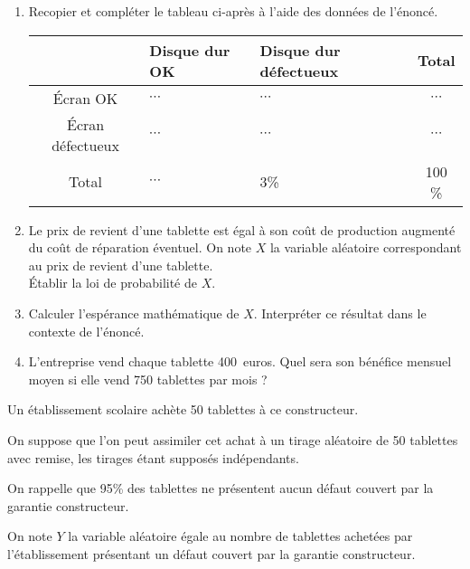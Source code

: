 \begin{enumerate}
     \par
     \item %
     Recopier et compléter le tableau ci-après à l'aide des données de l'énoncé.
     \begin{center}
          \begin{tabular}{|c|p{2cm}|p{2cm}|c|}%
               \hline
               $\ $ & Disque dur OK & Disque dur défectueux & Total \\
               \hline
               \'Ecran OK &  $\cdots$ & $\cdots$ & $\cdots$ \\
               \hline
               \'Ecran défectueux &  $\cdots$ & $\cdots$ & $\cdots$ \\
               \hline
               Total & $\cdots$ & 3\% & 100 \% \\
               \hline
          \end{tabular}
     \end{center}
     \item %
     Le prix de revient d'une tablette est égal à son coût de production augmenté du coût de réparation éventuel.
     On note $X$ la variable aléatoire correspondant au prix de revient d'une tablette.\\
     \'Etablir la loi de probabilité de $X$.
     \par
     \item %
     Calculer l'espérance mathématique de $X$. Interpréter ce résultat dans le contexte de l'énoncé.
     \par
     \item %
     L'entreprise vend chaque tablette 400~euros. Quel sera son bénéfice mensuel moyen si elle vend 750 tablettes par mois ?
     \par
\end{enumerate}
\par
%
%
%
%
\par
Un établissement scolaire achète 50 tablettes à ce constructeur.
\par
On suppose que l'on peut assimiler cet achat à un tirage aléatoire de 50 tablettes avec remise, les tirages étant supposés indépendants.
\par
On rappelle que 95\% des tablettes ne présentent aucun défaut couvert par la garantie constructeur.
\par
On note $Y$ la variable aléatoire égale au nombre de tablettes achetées par l'établissement présentant un défaut couvert par la garantie constructeur.
